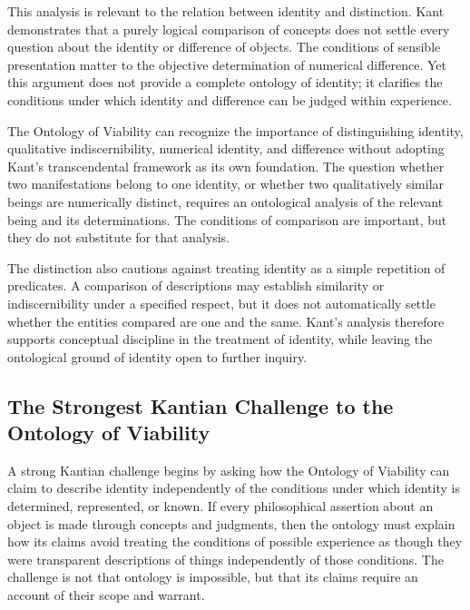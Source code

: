 This analysis is relevant to the relation
between identity and distinction. Kant
demonstrates that a purely logical comparison
of concepts does not settle every question
about the identity or difference of objects.
The conditions of sensible presentation
matter to the objective determination of
numerical difference. Yet this argument
does not provide a complete ontology of
identity; it clarifies the conditions
under which identity and difference
can be judged within experience.

\label{para:VS.B01.P01.C08.S10.SS12.P004}

The Ontology of Viability can recognize
the importance of distinguishing identity,
qualitative indiscernibility, numerical
identity, and difference without adopting
Kant's transcendental framework as its
own foundation. The question whether two
manifestations belong to one identity,
or whether two qualitatively similar
beings are numerically distinct, requires
an ontological analysis of the relevant
being and its determinations. The
conditions of comparison are important,
but they do not substitute for that analysis.

\label{para:VS.B01.P01.C08.S10.SS12.P005}

The distinction also cautions against
treating identity as a simple repetition
of predicates. A comparison of descriptions
may establish similarity or indiscernibility
under a specified respect, but it does
not automatically settle whether the
entities compared are one and the same.
Kant's analysis therefore supports
conceptual discipline in the treatment
of identity, while leaving the ontological
ground of identity open to further inquiry.



\subsection{The Strongest Kantian Challenge to the Ontology of Viability}
\label{subsec:ch08-kant-challenge}

\label{para:VS.B01.P01.C08.S10.SS13.P001}

A strong Kantian challenge begins by asking how
the Ontology of Viability can claim to describe
identity independently of the conditions under
which identity is determined, represented, or
known. If every philosophical assertion about
an object is made through concepts and judgments,
then the ontology must explain how its claims
avoid treating the conditions of possible
experience as though they were transparent
descriptions of things independently of those
conditions. The challenge is not that ontology
is impossible, but that its claims require
an account of their scope and warrant.

